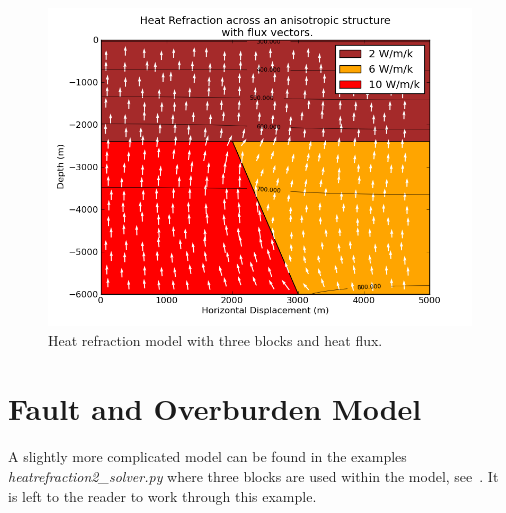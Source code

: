 \begin{figure}[ht]
\centerline{\includegraphics[width=4.in]{figures/heatrefraction2flux}}
\caption{Heat refraction model with three blocks and heat flux.}
\label{fig:hr002qumodel}
\end{figure}

\section{Fault and Overburden Model}
A slightly more complicated model can be found in the examples \textit{heatrefraction2_solver.py} where three blocks are used within the model, see~. It is left to the reader to work through this example.


